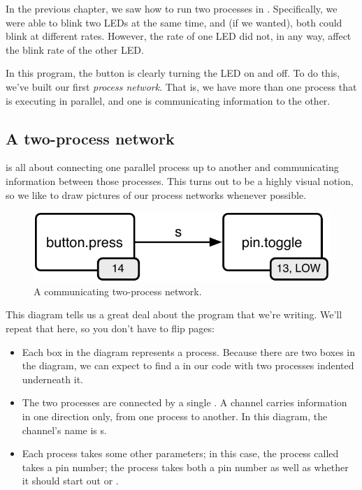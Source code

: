 \PATTERNS
In the previous chapter, we saw how to run two processes in \PARallel. Specifically, we were able to blink two LEDs at the same time, and (if we wanted), both could blink at different rates. However, the rate of one LED did not, in any way, affect the blink rate of the other LED.

In this program, the button is clearly turning the LED on and off. To do this, we've built our first {\em process network}. That is, we have more than one process that is executing in parallel, and one is communicating information to the other.

\subsection{A two-process network}
\plumbing is all about connecting one parallel process up to another and communicating information between those processes. This turns out to be a highly visual notion, so we like to draw pictures of our process networks whenever possible.
 
\begin{figure}[h]
  \begin{center}
    \includegraphics[width=0.8\linewidth]{images/ch4-button-toggle-led}
    \caption{A communicating two-process network.}
    \label{diagram:ch4-button-toggle-led}
  \end{center}
\end{figure}

This diagram tells us a great deal about the \plumbing program that we're writing. We'll repeat that here, so you don't have to flip pages:



\begin{itemize}
	\item Each box in the diagram represents a process. Because there are two boxes in the diagram, we can expect to find a \PAR in our code with two processes indented underneath it. 
	\item The two processes are connected by a single \CHANnel. A channel carries information in one direction only, from one process to another. In this diagram, the channel's name is {\code s}.
	\item Each process takes some other parameters; in this case, the process called \bp takes a pin number; the process \tp takes both a pin number as well as whether it should start out \LOW or \HIGH.
\end{itemize}

